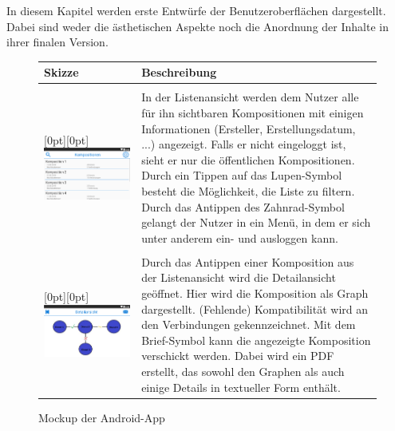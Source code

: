 In diesem Kapitel werden erste Entwürfe der Benutzeroberflächen dargestellt. Dabei sind weder die ästhetischen Aspekte noch die Anordnung der Inhalte in ihrer finalen Version. 

\begin{figure}[h]
	\centering
	
	\begin{tabularx}{\textwidth}{ p{} | X }
		\textbf{Skizze} & \textbf{Beschreibung} 
		
		\\ \hline \\
		
		\raisebox{-.9\height}[0pt][0pt]{\includegraphics[width=.5\textwidth]{img/mockup_list}}
		\label{fig:mock-list} 
		
		&In der Listenansicht werden dem Nutzer alle für ihn sichtbaren Kompositionen mit einigen Informationen (Ersteller, Erstellungsdatum, ...) angezeigt. Falls er nicht eingeloggt ist, sieht er nur die öffentlichen Kompositionen. Durch ein Tippen auf das Lupen-Symbol besteht die Möglichkeit, die Liste zu filtern. Durch das Antippen des Zahnrad-Symbol gelangt der Nutzer in ein Menü, in dem er sich unter anderem ein- und ausloggen kann.
				
		\\ \hline \\
		\raisebox{-.9\height}[0pt][0pt]{\includegraphics[width=.5\textwidth]{img/mockup_detail}}
		\label{fig:mock-detail} 
		
		& 
		Durch das Antippen einer Komposition aus der Listenansicht wird die Detailansicht geöffnet. Hier wird die Komposition als Graph dargestellt. (Fehlende) Kompatibilität wird an den Verbindungen gekennzeichnet. Mit dem Brief-Symbol kann die angezeigte Komposition verschickt werden.  Dabei wird ein PDF erstellt, das sowohl den Graphen als auch einige Details in textueller Form enthält. 
		
	\end{tabularx}
	
	\caption{Mockup der Android-App}
	\label{fig:app-mockup}
\end{figure}
